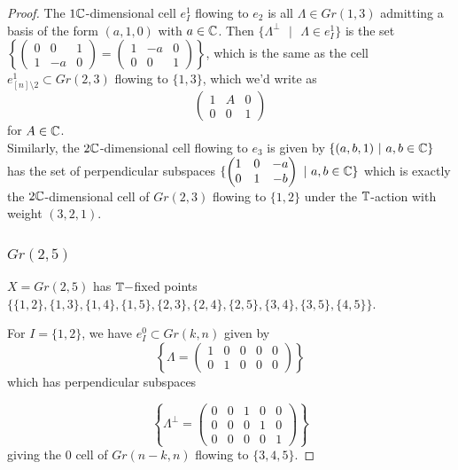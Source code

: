 \documentclass{amsart}
\begin{document}
\begin{proof}
The $1 \mathbb{C}$-dimensional cell $e_I^1$ flowing to $e_2$ is all $\Lambda \in Gr(1,3)$ admitting a basis of the form $(a, 1, 0)$ with $a\in \mathbb{C}$. Then $\{\Lambda^\perp \text{ }|\text{ } \Lambda \in e^1_I\}$ is the set $\left\{ \left( \begin{matrix} 0 & 0 & 1 \\ 1 & -a & 0 \end{matrix}\right) = \left( \begin{matrix} 1 & -a & 0 \\ 0 & 0 & 1 \end{matrix}\right) \right\} $, which is the same as the cell $e^1_{[n]\setminus 2} \subset Gr(2,3)$ flowing to $\{1,3\}$, which we'd write as \[ \left( \begin{matrix} 1 & A & 0 \\ 0 & 0 & 1 \end{matrix}\right) \] for $A\in \mathbb{C}$.   \\

Similarly, the $2 \mathbb{C}$-dimensional cell flowing to $e_3$ is given by $\{ (a, b, 1 ) \text{ }|\text{ } a,b\in \mathbb{C}\}$ has the set of perpendicular subspaces $\{ \left( \begin{matrix} 1 & 0 & -a \\ 0 & 1 & -b \end{matrix} \right) \text{ }|\text{ } a,b \in \mathbb{C}\}$ which is exactly the $2 \mathbb{C}$-dimensional cell of $Gr(2,3)$ flowing to $\{1,2\}$ under the $\mathbb{T}$-action with weight $(3,2,1)$. \\

\subsubsection{$Gr(2,5)$}

$X = Gr(2,5)$ has $\mathbb{T}-$fixed points $\{ \{1,2\},\{1,3\}, \{1,4\}, \{1,5\}, \{2,3\}, \{2,4\}, \{2,5\}, \{3,4\}, \{3,5\}, \{4,5\} \}$.

For $I=\{1,2\}$, we have $e^0_I \subset Gr(k,n)$ given by \[ \left\{ \Lambda = \left( \begin{matrix} 1 & 0 & 0 & 0 & 0 \\ 0 & 1 & 0 & 0 & 0 \end{matrix}\right) \right\} \] which has perpendicular subspaces 


     \[  \left\{ \Lambda^\perp = \left( \begin{matrix} 0 &0 &1& 0& 0 \\ 0& 0 &0& 1 &0 \\ 0& 0& 0& 0& 1 \end{matrix} \right) \right\} \] giving the $0$ cell of $Gr(n-k,n)$ flowing to $\{3,4,5\}$.



\end{proof}
\end{document}
